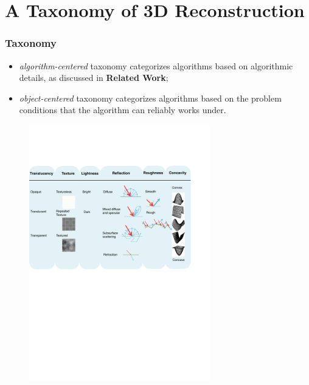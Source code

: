 \documentclass{beamer}
\begin{document}
\section{A Taxonomy of 3D Reconstruction} %


\begin{frame}
\frametitle{Taxonomy}
\begin{itemize}
\item \textit{algorithm-centered} taxonomy categorizes algorithms based on algorithmic details, as discussed in \textbf{Related Work};
\item \textit{object-centered} taxonomy categorizes algorithms based on the problem conditions that the algorithm can reliably works under.
\end{itemize}

\begin{figure}[h]
\includegraphics[width=0.7\textwidth]{taxo/obj_class}
\end{figure}

\end{frame}
\end{document}
